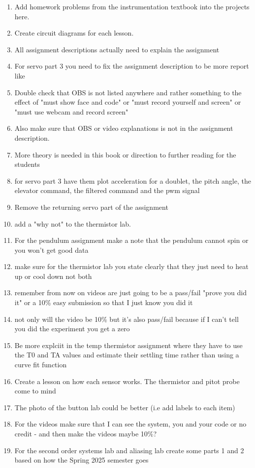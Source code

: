 \begin{enumerate}[itemsep=-5pt]
\item Add homework problems from the instrumentation textbook into the projects here. 
\item Create circuit diagrams for each lesson.
\item All assignment descriptions actually need to explain the assignment
\item For servo part 3 you need to fix the assignment description to be more report like
\item Double check that OBS is not listed anywhere and rather something to the effect of "must show face and code" or "must record yourself and screen" or "must use webcam and record screen"
\item Also make sure that OBS or video explanations is not in the assignment description.
\item More theory is needed in this book or direction to further
  reading for the students
\item for servo part 3 have them plot acceleration for a doublet, the pitch angle, the elevator command, the filtered command and the pwm signal
\item Remove the returning servo part of the assignment
\item add a "why not" to the thermistor lab.
\item For the pendulum assignment make a note that the pendulum cannot spin or you won't get good data
\item make sure for the thermistor lab you state clearly that they just need to heat up or cool down not both
\item remember from now on videos are just going to be a pass/fail "prove you did it" or a 10\% easy submission so that I just know you did it
\item not only will the video be 10\% but it's also pass/fail because if I can't tell you did the experiment you get a zero
\item Be more explciit in the temp thermistor assignment where they have to use the T0 and TA values and estimate their settling time rather than using a curve fit function
\item Create a lesson on how each sensor works. The thermistor and pitot probe come to mind 
\item The photo of the button lab could be better (i.e add labels to
  each item)
\item For the videos make sure that I can see the system, you and your code or no credit - and then make the videos maybe 10\%?
\item For the second order systems lab and aliasing lab create some parts 1 and 2 based on how the Spring 2025 semester goes

\end{enumerate}
